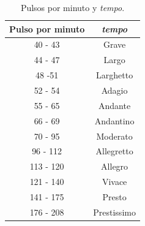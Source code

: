\documentclass[a4paper, openright, 11pt, titlepage]{report}
\theoremstyle{definition}\newtheorem{defin}[propo]{Definition}
\theoremstyle{definition}\newtheorem{obser}[propo]{Remark}
\theoremstyle{definition}\newtheorem{ejem}[propo]{Ejemplo}
\theoremstyle{definition}\newtheorem{algoritmo}[propo]{Algoritmo}
\begin{document}
\begin{table}[H]
    \centering
    \begin{tabular}{c|c}
     Pulso por minuto & \textit{tempo} \\
    \hline \hline
     40 - 43 & Grave\\
     44 - 47 & Largo \\
     48 -51 & Larghetto \\
     52 - 54 & Adagio\\
     55 - 65 & Andante \\
     66 - 69 & Andantino \\
     70 - 95 & Moderato \\
     96 - 112 & Allegretto \\
     113 - 120 & Allegro \\
     121 - 140 & Vivace \\
     141 - 175 & Presto\\
     176 - 208 & Prestissimo\\
     \hline
    \end{tabular}
    \caption{Pulsos por minuto y \textit{tempo}.}
\end{table}
\end{document}
